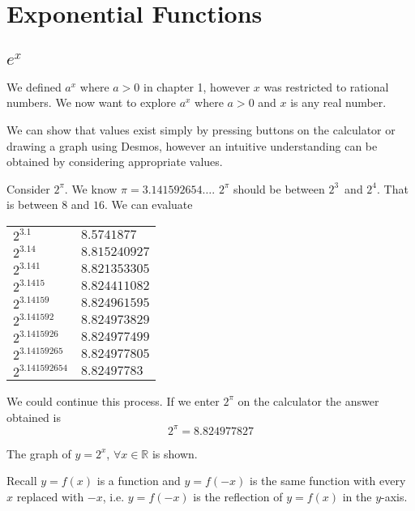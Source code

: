 \chapter{Exponential Functions}
\section{$e^x$}
We defined $a^{x}$ where $a >0$ in chapter 1, however $x$ was restricted to rational numbers. We now want to explore $a^{x}$ where $a >0$ and $x$ is any real number. 

We can show that values exist simply by pressing buttons on the calculator or drawing
a graph using Desmos, however an intuitive understanding can be obtained by considering appropriate values. 

Consider $2^{\pi }$. We know $\pi  =3.141592654 \ldots $. $2^{\pi }$ should be between $2^{3}$\ and $2^{4}$. That is between $8$ and $16$. We can evaluate 

\qquad \qquad \qquad \qquad \qquad \qquad \qquad \qquad
\begin{tabular}[c]{ll}$2^{3.1}$  & $8.5741877$  \\
$2^{3.14}$  & $8.815240927$  \\
$2^{3.141}$  & $8.821353305$  \\
$2^{3.1415}$  & $8.824411082$  \\
$2^{3.14159}$  & $8.824961595$  \\
$2^{3.141592}$  & $8.824973829$  \\
$2^{3.1415926}$  & $8.824977499$  \\
$2^{3.14159265}$  & $8.824977805$  \\
$2^{3.141592654}$  & $8.82497783$
\end{tabular}

We could continue this process. If
we enter $2^{\pi }$ on the calculator the answer obtained is
\begin{equation*}2^{\pi } =8.824977827
\end{equation*}

The graph of $y =2^{x}$, $ \forall x \in \mathbb{R}$ is shown. 

   
\setlength\fboxrule{0.01in}\setlength\fboxsep{0.2in}


Recall $y =f (x)$ is a function and $y =f ( -x)$ is the same function with every $x$ replaced with $ -x$, i.e. $y =f ( -x)$ is the reflection of $y =f (x)$ in the $y$-axis. 

